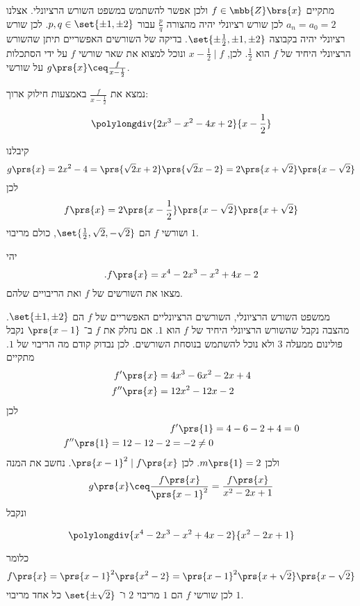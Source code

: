 \documentclass[article, 10pt,oneside]{article}
\begin{document}
\begin{solution}
מתקיים
$f \in \mbb{Z}\brs{x}$
ולכן אפשר להשתמש במשפט השורש הרציונלי. אצלנו
$a_n = a_0 = 2$
לכן שורש רציונלי יהיה מהצורה
$\frac{p}{q}$
עבור
$p,q \in \set{\pm 1, \pm 2}$.
לכן שורש רציונלי יהיה בקבוצה
$\set{\pm \frac{1}{2}, \pm 1, \pm 2}$.
בדיקה של השורשים האפשריים תיתן שהשורש הרציונלי היחיד של
$f$
הוא
$\frac{1}{2}$.
לכן,
$x - \frac{1}{2} \mid f$
ונוכל למצוא את שאר שורשי
$f$
על ידי הסתכלות על שורשי
$g\prs{x} \ceq \frac{f}{x-\frac{1}{2}}$.

נמצא את
$\frac{f}{x-\frac{1}{2}}$
באמצעות חילוק ארוך:

\begin{otherlanguage}{english}
\[
\polylongdiv{2x^3 - x^2 - 4x + 2}{x-\frac{1}{2}}
\]
\end{otherlanguage}

קיבלנו
\[g\prs{x} = 2x^2 - 4 = \prs{\sqrt{2}x + 2}\prs{\sqrt{2}x - 2} = 2 \prs{x + \sqrt{2}}\prs{x-\sqrt{2}}\]
לכן
\[f\prs{x} = 2 \prs{x-\frac{1}{2}}\prs{x-\sqrt{2}}\prs{x+\sqrt{2}}\]
ושורשי
$f$
הם
$\set{\frac{1}{2}, \sqrt{2}, -\sqrt{2}}$,
כולם מריבוי
$1$.
\end{solution}

\begin{exercise}
יהי
\[\text{.} f\prs{x} = x^4 - 2x^3 - x^2 + 4x - 2\]
מצאו את השורשים של
$f$
ואת הריבויים שלהם.
\end{exercise}

\begin{solution}
ממשפט השורש הרציונלי, השורשים הרציונליים האפשריים של
$f$
הם
$\set{\pm 1, \pm 2}$.
מהצבה נקבל שהשורש הרציונלי היחיד של
$f$
הוא
$1$.
אם נחלק את
$f$
ב־%
$\prs{x-1}$
נקבל פולינום ממעלה
$3$
ולא נוכל להשתמש בנוסחת השורשים. לכן נבדוק קודם מה הריבוי של
$1$.
מתקיים
\begin{align*}
f'\prs{x} &= 4x^3 -6x^2 -2x + 4 \\
f''\prs{x} &= 12x^2 - 12x - 2
\end{align*}
לכן
\begin{align*}
f'\prs{1} &= 4-6-2 + 4 = 0 \\
f''\prs{1} = 12 - 12 - 2 = -2 \neq 0
\end{align*}
ולכן
$m\prs{1} = 2$.
לכן
$\prs{x-1}^2 \mid f\prs{x}$.
נחשב את המנה
\[g\prs{x} \ceq \frac{f\prs{x}}{\prs{x-1}^2} = \frac{f\prs{x}}{x^2 - 2x + 1}\]
ונקבל
\begin{otherlanguage}{english}
\[
\polylongdiv{x^4 - 2x^3 - x^2 + 4x - 2}{x^2 - 2x + 1}
\]
\end{otherlanguage}

כלומר
\[f\prs{x} = \prs{x-1}^2 \prs{x^2 - 2} = \prs{x-1}^2 \prs{x+\sqrt{2}}\prs{x-\sqrt{2}}\]
לכן שורשי
$f$
הם
$1$
מריבוי
$2$
ו־%
$\set{\pm \sqrt{2}}$
כל אחד מריבוי
$1$.
\end{solution}
\end{document}
